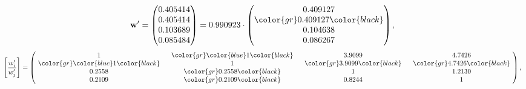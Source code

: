 \begin{example}
\begin{equation*}
\mathbf{w}^{\prime} =
\begin{pmatrix}
0.405414\\
0.405414\\
0.103689\\
0.085484
\end{pmatrix} =
0.990923\cdot
\begin{pmatrix}
0.409127\\
\color{gr} 0.409127\color{black} \\
0.104638\\
0.086267
\end{pmatrix},
\end{equation*}
\begin{equation*}
\left[ \frac{{w}^{\prime}_i}{{w}^{\prime}_j} \right] =
\begin{pmatrix}
$\,\,$ 1 $\,\,$ & $\,\,$\color{gr} \color{blue} 1\color{black} $\,\,$ & $\,\,$3.9099$\,\,$ & $\,\,$4.7426$\,\,$ \\
$\,\,$\color{gr} \color{blue} 1\color{black} $\,\,$ & $\,\,$ 1 $\,\,$ & $\,\,$\color{gr} 3.9099\color{black} $\,\,$ & $\,\,$\color{gr} 4.7426\color{black}   $\,\,$ \\
$\,\,$0.2558$\,\,$ & $\,\,$\color{gr} 0.2558\color{black} $\,\,$ & $\,\,$ 1 $\,\,$ & $\,\,$1.2130 $\,\,$ \\
$\,\,$0.2109$\,\,$ & $\,\,$\color{gr} 0.2109\color{black} $\,\,$ & $\,\,$0.8244$\,\,$ & $\,\,$ 1  $\,\,$ \\
\end{pmatrix},
\end{equation*}
\end{example}
\newpage
